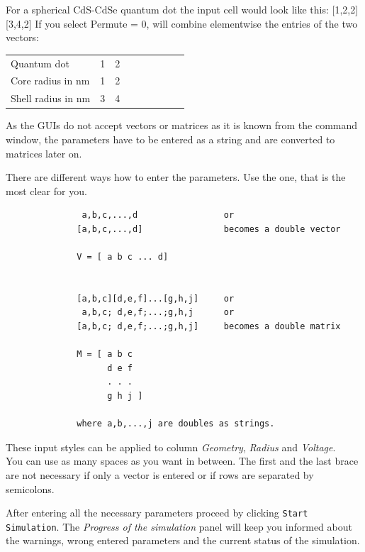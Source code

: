 \begin{enumerate}
							\begin{EXAMPLE}
								For a spherical CdS-CdSe quantum dot the input cell would look like this: [1,2,2][3,4,2]
								If you select Permute = 0, \software will combine elementwise the entries of the two vectors: \\
								\newline
								\begin{tabular}{@{}lcccccccc}
									Quantum dot					&	1	&	2	\\
									Core radius	in nm		&	1	& 2	\\
									Shell radius in nm	& 3	& 4	\\
								\end{tabular}
							\end{EXAMPLE}
			\end{enumerate}
			
			\begin{REMARK} 
				As the \matlab \gls{GUI}s do not accept vectors or matrices as it is known from the command window, the parameters
				have to be entered as a string and are converted to matrices later on.
				
				There are different ways how to enter the parameters. Use the one, that is the most clear for you.
				\begin{lstlisting}
               a,b,c,...,d                 or
              [a,b,c,...,d]                becomes a double vector

              V = [ a b c ... d]


              [a,b,c][d,e,f]...[g,h,j]     or
               a,b,c; d,e,f;...;g,h,j      or
              [a,b,c; d,e,f;...;g,h,j]     becomes a double matrix

              M = [ a b c
                    d e f
                    . . .
                    g h j ]

              where a,b,...,j are doubles as strings.
   			\end{lstlisting}
   			These input styles can be applied to column {\it Geometry}, {\it Radius} and {\it Voltage}.	\\
   			You can use as many spaces as you want in between. The first and the last brace are not necessary if only a vector is entered or if
   			rows are separated by semicolons.
			\end{REMARK}
			
			After entering all the necessary parameters proceed by clicking \lstinline{Start Simulation}. The {\it Progress of the simulation} panel will
			keep you informed about the warnings, wrong entered parameters and the current status of the simulation.
			


